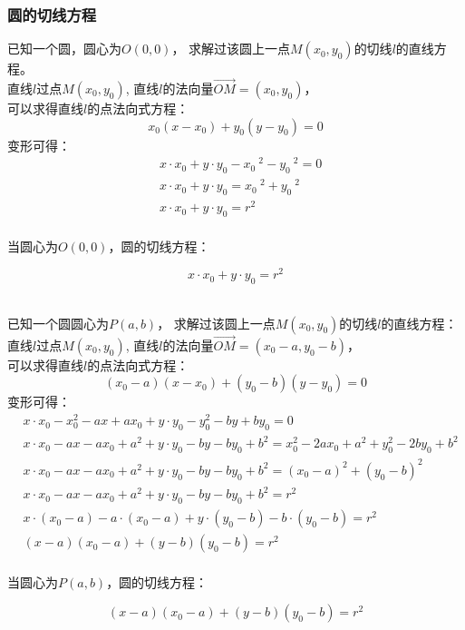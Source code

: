\documentclass[UTF8]{ctexart}
\begin{document}
\newpage

\subsubsection{圆的切线方程}
    已知一个圆，圆心为$O(0,0)$，
    求解过该圆上一点$M(x_0,y_0)$的切线$l$的直线方程。\\[3mm]
    直线$l$过点$M(x_0,y_0)$,
    直线$l$的法向量$\overrightarrow{OM}=(x_0,y_0)$，\\[3mm]
    可以求得直线$l$的点法向式方程：
    \setcounter{equation}{0}
    \begin{equation}
        x_0(x-x_0)+y_0(y-y_0)=0
    \end{equation}
    变形可得：
    \begin{align}
        &x\cdot x_0+y\cdot y_0-x_0~^2-y_0~^2=0\\[1mm]
        &x\cdot x_0+y\cdot y_0=x_0~^2+y_0~^2\\[1mm]
        &x\cdot x_0+y\cdot y_0=r^2
    \end{align}\\
    当圆心为$O(0,0)$，圆的切线方程：
    \begin{large}
        \begin{equation*}
            x\cdot x_0+y\cdot y_0=r^2
        \end{equation*}
    \end{large}\\[5mm]
    已知一个圆圆心为$P(a,b)$，
    求解过该圆上一点$M(x_0,y_0)$的切线$l$的直线方程：\\[3mm]
    直线$l$过点$M(x_0,y_0)$,
    直线$l$的法向量$\overrightarrow{OM}=(x_0-a,y_0-b)$，\\[3mm]
    可以求得直线$l$的点法向式方程：
    \setcounter{equation}{0}
    \begin{equation}
        (x_0-a)(x-x_0)+(y_0-b)(y-y_0)=0
    \end{equation}
    变形可得：
    \begin{align}
        &x \cdot x_0-x_0^2-ax+ax_0+y \cdot y_0-y_0^2-by+by_0=0\\[1mm]
        &x \cdot x_0-ax-ax_0+a^2+y \cdot y_0-by-by_0+b^2=x_0^2-2ax_0+a^2+y_0^2-2by_0+b^2\\[1mm]
        &x \cdot x_0-ax-ax_0+a^2+y \cdot y_0-by-by_0+b^2=(x_0-a)^2+(y_0-b)^2\\[1mm]
        &x \cdot x_0-ax-ax_0+a^2+y \cdot y_0-by-by_0+b^2=r^2\\[1mm]
        &x \cdot (x_0-a)-a \cdot (x_0-a)+y \cdot (y_0-b)-b \cdot (y_0-b)=r^2\\[1mm]
        &(x-a)(x_0-a)+(y-b)(y_0-b)=r^2
    \end{align}\\
    当圆心为$P(a,b)$，圆的切线方程：
    \begin{large}
        \begin{equation*}
            (x-a)(x_0-a)+(y-b)(y_0-b)=r^2
        \end{equation*}
    \end{large}
\end{document}
